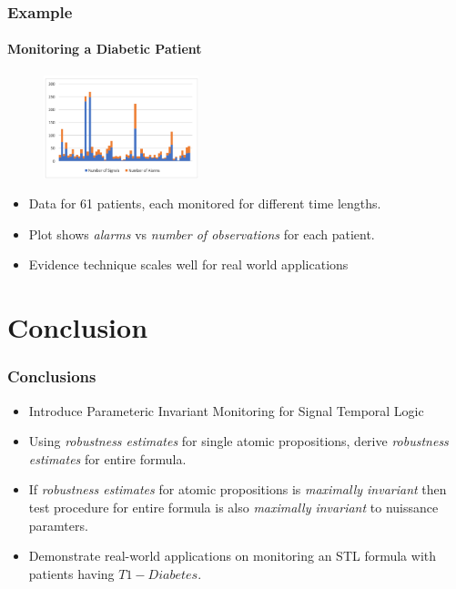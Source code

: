 \documentclass{beamer}
\begin{document}
\begin{frame}
    \frametitle{Example}
    \framesubtitle{Monitoring a Diabetic Patient}
    \begin{figure}[h]
        \centering
        \includegraphics[width=0.4\textwidth]{false-alarms}
    \end{figure}
    \begin{itemize}
        \item Data for 61 patients, each monitored for different time lengths.
        \item Plot shows \textit{alarms} vs \textit{number of observations}
            for each patient.
        \item Evidence technique scales well for real world applications
    \end{itemize}
\end{frame}

\section{Conclusion}
\begin{frame}
    \frametitle{Conclusions}
    \begin{itemize}
        \item Introduce Parameteric Invariant Monitoring
            for Signal Temporal Logic
        \item Using \textit{robustness estimates} for
            single atomic propositions, derive \textit{robustness estimates}
            for entire formula.
        \item If \textit{robustness estimates} for
            atomic propositions is \textit{maximally invariant}
            then test procedure for entire formula is also
            \textit{maximally invariant} to nuissance paramters.
        \item Demonstrate real-world applications on monitoring
            an STL formula with patients having $T1-Diabetes$.
    \end{itemize}
\end{frame}
\end{document}
